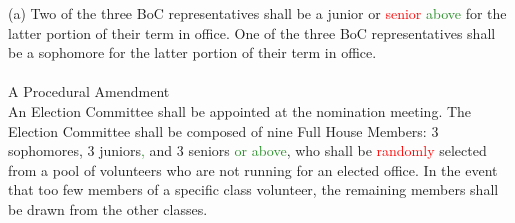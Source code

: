 \documentclass[10pt]{article} %
\newcommand{\add}[1]{\textcolor{ForestGreen}{#1}} %
\newcommand{\del}[1]{\textcolor{red}{#1}} %
\newcommand{\swap}[2]{\del{#1} \add{#2}} %
\begin{document}
\begin{itemize}
        (a) Two of the three BoC representatives shall be a junior or \swap{senior}{above} for the latter portion of their term in office. One of the three BoC representatives shall be a sophomore for the latter portion of their term in office.
        \\ \\
        A Procedural Amendment \\
        An Election Committee shall be appointed at the nomination meeting. The Election Committee shall be composed of nine Full House Members: 3 sophomores, 3 juniors\add{,} and 3 seniors \add{or above}, who shall be \del{randomly} selected from a pool of volunteers who are not running for an elected office. In the event that too few members of a specific class volunteer, the remaining members shall be drawn from the other classes.

\end{itemize}
\end{document}
